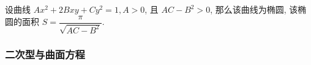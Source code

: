 \begin{inference}[一般椭圆面积公式]
    设曲线 $Ax^2+2Bxy+Cy^2=1,A>0$, 且 $AC-B^2>0$, 那么该曲线为椭圆, 该椭圆的面积 $S=\dfrac{\pi}{\sqrt{AC-B^2}}.$
\end{inference}

\subsubsection{二次型与曲面方程}


